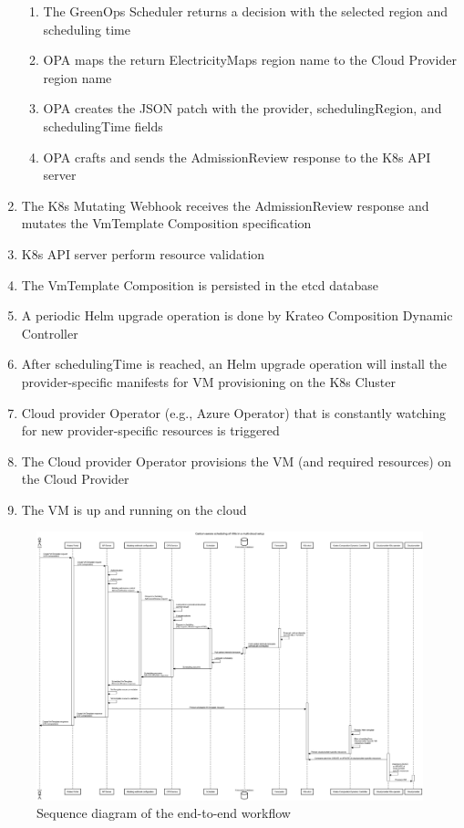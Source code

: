 \begin{enumerate}
\begin{enumerate}
    \item The GreenOps Scheduler returns a decision with the selected region and scheduling time
    \item OPA maps the return ElectricityMaps region name to the Cloud Provider region name
    \item OPA creates the JSON patch with the provider, schedulingRegion, and schedulingTime fields
    \item OPA crafts and sends the AdmissionReview response to the K8s API server 
  \end{enumerate}
  \item The K8s Mutating Webhook receives the AdmissionReview response and mutates the VmTemplate Composition specification
  \item K8s API server perform resource validation
  \item The VmTemplate Composition is persisted in the etcd database
  \item A periodic Helm upgrade operation is done by Krateo Composition Dynamic Controller
  \item After schedulingTime is reached, an Helm upgrade operation will install the provider-specific manifests for VM provisioning on the K8s Cluster
  \item Cloud provider Operator (e.g., Azure Operator) that is constantly watching for new provider-specific resources is triggered
  \item The Cloud provider Operator provisions the VM (and required resources) on the Cloud Provider
  \item The VM is up and running on the cloud
\end{enumerate}

\begin{figure}
  \centering
  \includegraphics[width=\textheight]{images/sequence_diagram.png}
  \caption{Sequence diagram of the end-to-end workflow}
  \label{fig:sequence_diagram}
\end{figure}

\newpage
